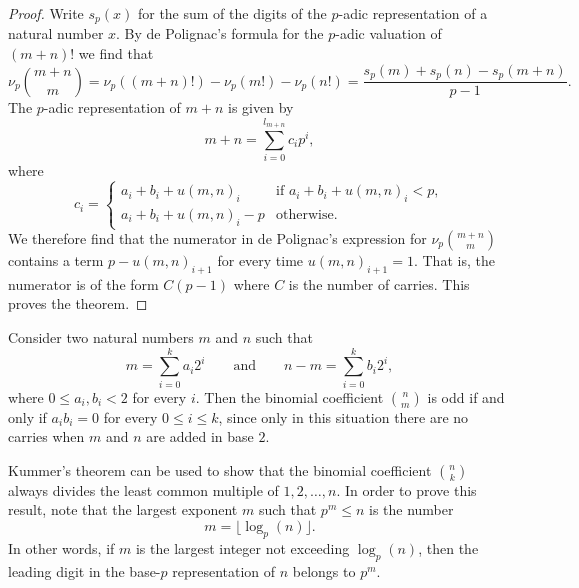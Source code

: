 \begin{proof}
  Write $s_p(x)$ for the sum of the digits of the $p$-adic representation of a natural number $x$. By de Polignac's formula for the $p$-adic valuation of $(m+n)!$ we find that
  \begin{equation*}
    \nu_p\binom{m+n}{m} = \nu_p((m+n)!)-\nu_p(m!)-\nu_p(n!) =
    \frac{s_p(m)+s_p(n)-s_p(m+n)}{p-1}.
  \end{equation*}
  The $p$-adic representation of $m+n$ is given by
  \begin{equation*}
    m+n = \sum_{i=0}^{l_{m+n}}c_ip^i,
  \end{equation*}
  where
  \begin{equation*}
    c_i =
    \begin{cases}
      a_i+b_i + u(m,n)_i & \text{if } a_i+b_i+u(m,n)_i<p, \\
      a_i+b_i + u(m,n)_i - p & \text{otherwise}.
    \end{cases}
  \end{equation*}
  We therefore find that the numerator in de Polignac's expression for $\nu_p\binom{m+n}{m}$ contains a term $p-u(m,n)_{i+1}$ for every time $u(m,n)_{i+1}=1$. That is, the numerator is of the form $C(p-1)$ where $C$ is the number of carries. This proves the theorem.
\end{proof}

\begin{example}
  Consider two natural numbers $m$ and $n$ such that
  \begin{equation*}
    m=\sum_{i=0}^k a_i2^i \qquad\text{and}\qquad n-m=\sum_{i=0}^kb_i2^i,
  \end{equation*}
  where $0\leq a_i,b_i<2$ for every $i$. Then the binomial coefficient $\binom{n}{m}$ is odd if and only if $a_ib_i=0$ for every $0\leq i \leq k$, since only in this situation there are no carries when $m$ and $n$ are added in base $2$.
\end{example}

Kummer's theorem can be used to show that the binomial coefficient $\binom{n}{k}$ always divides the least common multiple of $1,2,\ldots,n$. In order to prove this result, note that the largest exponent $m$ such that $p^m\leq n$ is the number
\begin{equation*}
  m=\lfloor \log_p(n)\rfloor.
\end{equation*}
In other words, if $m$ is the largest integer not exceeding $\log_p(n)$, then the leading digit in the base-$p$ representation of $n$ belongs to $p^m$. 

